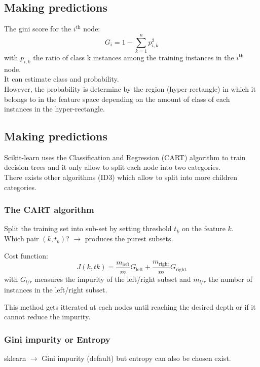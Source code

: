 \subsection{Making predictions}

The gini score for the $i^\mathrm{th}$ node:
\begin{equation}
    G_i = 1 - \sum_{k=1}^{n}p_{i,k}^2
\end{equation}
with $p_{i,k}$ the ratio of class k instances among the training instances in the $i^\mathrm{th}$ node.\\

It can estimate class and probability.\\
However, the probability is determine by the region (hyper-rectangle) in which it belongs to in the feature space depending on the amount of class of each instances in the hyper-rectangle.

\subsection{Making predictions}

Scikit-learn uses the Classification and Regression (CART) algorithm to train decision trees and it only allow to split each node into two categories.\\

There exists other algorithms (ID3) which allow to split into more children categories.\\

\subsubsection*{The CART algorithm}
Split the training set into sub-set by setting threshold $t_k$ on the feature $k$.\\
Which pair $\left(k, t_k\right)$? $\rightarrow$ produces the purest subsets.

Cost function:
\begin{equation}
    J\left(k, tk\right) = \frac{m_\mathrm{left}}{m} G_\mathrm{left} + \frac{m_\mathrm{right}}{m} G_\mathrm{right}
\end{equation}
with $G_{l/r}$ measures the impurity of the left/right subset and $m_{l/r}$ the number of instances in the left/right subset.

This method gets itterated at each nodes until reaching the desired depth or if it cannot reduce the impurity.

\subsubsection*{Gini impurity or Entropy}
sklearn $\rightarrow$ Gini impurity (default) but entropy can also be chosen exist.\\

